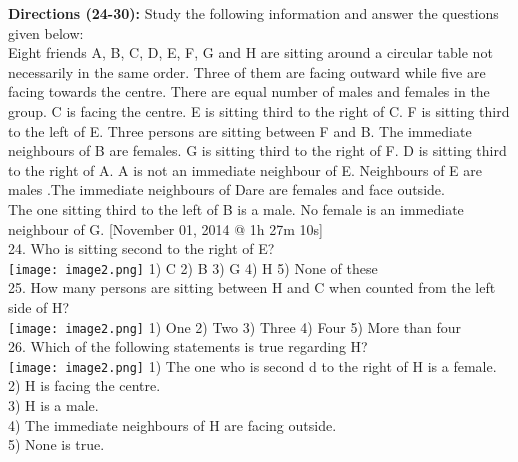 \documentclass[
]{article}
\begin{document}
\textbf{Directions (24-30):} Study the following information and answer the questions given below:\\
Eight friends A, B, C, D, E, F, G and H are sitting around a circular table not necessarily in the
same order. Three of them are facing outward while five are facing towards the centre. There
are equal number of males and females in the group.
C is facing the centre. E is sitting third to the right of C. F is sitting third to the left of E. Three
persons are sitting between F and B. The immediate neighbours of B are females. G is sitting
third to the right of F. D is sitting third to the right of A. A is not an immediate neighbour of E.
Neighbours of E are males .The immediate neighbours of Dare are females and face outside.\\
The one sitting third to the left of B is a male. No female is an immediate neighbour of G.
[November 01, 2014 @ 1h 27m 10s]\\

24. Who is sitting second to the right of E?\\
\texttt{[image: image2.png]}
1) C \hspace{2mm}2) B \hspace{2mm}3) G \hspace{2mm}4) H \hspace{2mm}5) None of these\\

25. How many persons are sitting between H and C when counted from the left side of H?\\
\texttt{[image: image2.png]}
1) One \hspace{2mm}2) Two \hspace{2mm}3) Three \hspace{2mm}4) Four \hspace{2mm}5) More than four\\

26. Which of the following statements is true regarding H?\\
\texttt{[image: image2.png]}
1) The one who is second d to the right of H is a female.\\
2) H is facing the centre.\\
3) H is a male.\\
4) The immediate neighbours of H are facing outside.\\
5) None is true.\\
\end{document}
